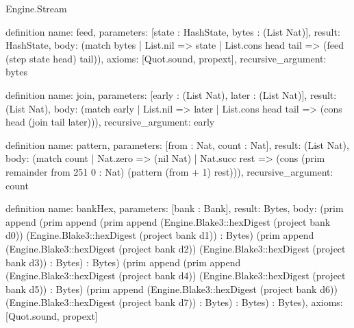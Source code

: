 \begin{lexlean}{Engine.Stream}
\begin{semanticmodule}
definition{
  name: feed,
  parameters: [state : HashState, bytes : (List Nat)],
  result: HashState,
  body: (match bytes | List.nil => state | List.cons head tail => (feed (step state head) tail)),
  axioms: [Quot.sound, propext],
  recursive_argument: bytes
}

definition{
  name: join,
  parameters: [early : (List Nat), later : (List Nat)],
  result: (List Nat),
  body: (match early | List.nil => later | List.cons head tail => (cons head (join tail later))),
  recursive_argument: early
}

definition{
  name: pattern,
  parameters: [from : Nat, count : Nat],
  result: (List Nat),
  body: (match count
    | Nat.zero => (nil Nat)
    | Nat.succ rest => (cons (prim remainder from 251 0 : Nat) (pattern (from + 1) rest))),
  recursive_argument: count
}

definition{
  name: bankHex,
  parameters: [bank : Bank],
  result: Bytes,
  body: (prim append (prim append (prim append (Engine.Blake3::hexDigest (project bank d0)) (Engine.Blake3::hexDigest (project bank d1)) : Bytes) (prim append (Engine.Blake3::hexDigest (project bank d2)) (Engine.Blake3::hexDigest (project bank d3)) : Bytes) : Bytes) (prim append (prim append (Engine.Blake3::hexDigest (project bank d4)) (Engine.Blake3::hexDigest (project bank d5)) : Bytes) (prim append (Engine.Blake3::hexDigest (project bank d6)) (Engine.Blake3::hexDigest (project bank d7)) : Bytes) : Bytes) : Bytes),
  axioms: [Quot.sound, propext]
}


\end{semanticmodule}
\end{lexlean}
